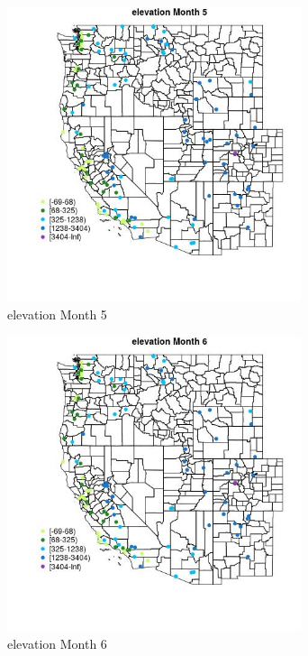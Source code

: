 \begin{figure} 
\centering  
\includegraphics[width=0.77\textwidth]{Code_Outputs/Report_ML_input_PM25_Step4_part_e_de_duplicated_aveswNAs_MapObsMo5elevation.jpg} 
\caption{\label{fig:Report_ML_input_PM25_Step4_part_e_de_duplicated_aveswNAsMapObsMo5elevation}elevation Month 5} 
\end{figure} 
 

\begin{figure} 
\centering  
\includegraphics[width=0.77\textwidth]{Code_Outputs/Report_ML_input_PM25_Step4_part_e_de_duplicated_aveswNAs_MapObsMo6elevation.jpg} 
\caption{\label{fig:Report_ML_input_PM25_Step4_part_e_de_duplicated_aveswNAsMapObsMo6elevation}elevation Month 6} 
\end{figure} 
 

